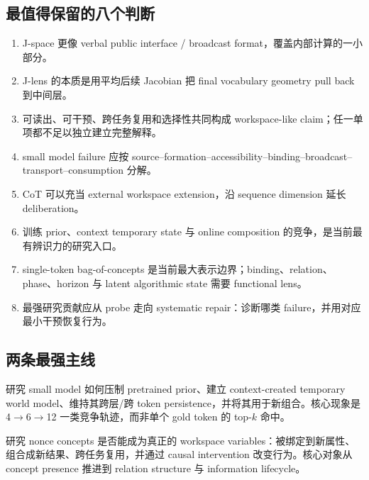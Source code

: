 \documentclass[10.5pt,a4paper]{ctexart}
\begin{document}
\subsection{最值得保留的八个判断}
\begin{enumerate}
  \item J-space 更像 verbal public interface / broadcast format，覆盖内部计算的一小部分。
  \item J-lens 的本质是用平均后续 Jacobian 把 final vocabulary geometry pull back 到中间层。
  \item 可读出、可干预、跨任务复用和选择性共同构成 workspace-like claim；任一单项都不足以独立建立完整解释。
  \item small model failure 应按 source--formation--accessibility--binding--broadcast--transport--consumption 分解。
  \item CoT 可以充当 external workspace extension，沿 sequence dimension 延长 deliberation。
  \item 训练 prior、context temporary state 与 online composition 的竞争，是当前最有辨识力的研究入口。
  \item single-token bag-of-concepts 是当前最大表示边界；binding、relation、phase、horizon 与 latent algorithmic state 需要 functional lens。
  \item 最强研究贡献应从 probe 走向 systematic repair：诊断哪类 failure，并用对应最小干预恢复行为。
\end{enumerate}

\subsection{两条最强主线}
\begin{inferclaim}[title={\bfseries 主线 A：Prior--Context Override Dynamics}]
研究 small model 如何压制 pretrained prior、建立 context-created temporary world model、维持其跨层/跨 token persistence，并将其用于新组合。核心现象是 4$\to$6$\to$12 一类竞争轨迹，而非单个 gold token 的 top-$k$ 命中。
\end{inferclaim}

\begin{inferclaim}[title={\bfseries 主线 B：Novel Variable Binding + Online Composition}]
研究 nonce concepts 是否能成为真正的 workspace variables：被绑定到新属性、组合成新结果、跨任务复用，并通过 causal intervention 改变行为。核心对象从 concept presence 推进到 relation structure 与 information lifecycle。
\end{inferclaim}
\end{document}
